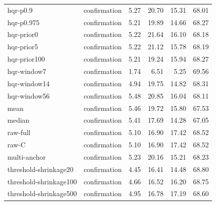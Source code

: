\begin{longtable}{llrrrr}
hqr-p0.9 & confirmation & 5.27 & 20.70 & 15.31 & 68.01\\
hqr-p0.975 & confirmation & 5.21 & 19.89 & 14.66 & 68.27\\
hqr-prior0 & confirmation & 5.22 & 21.64 & 16.10 & 68.18\\
hqr-prior5 & confirmation & 5.22 & 21.12 & 15.78 & 68.19\\
hqr-prior100 & confirmation & 5.21 & 19.24 & 15.94 & 68.27\\
hqr-window7 & confirmation & 1.74 & 6.51 & 5.25 & 69.56\\
hqr-window14 & confirmation & 4.94 & 19.75 & 14.82 & 68.31\\
hqr-window56 & confirmation & 5.48 & 20.85 & 16.04 & 68.11\\
mean & confirmation & 5.46 & 19.72 & 15.80 & 67.53\\
median & confirmation & 5.41 & 17.69 & 14.28 & 67.05\\
raw-full & confirmation & 5.10 & 16.90 & 17.42 & 68.52\\
raw-C & confirmation & 5.10 & 16.90 & 17.42 & 68.52\\
multi-anchor & confirmation & 5.23 & 20.16 & 15.21 & 68.23\\
threshold-shrinkage20 & confirmation & 4.45 & 16.41 & 14.48 & 68.80\\
threshold-shrinkage100 & confirmation & 4.66 & 16.52 & 16.20 & 68.75\\
threshold-shrinkage500 & confirmation & 4.95 & 16.78 & 17.19 & 68.60\\
\end{longtable}\endgroup
